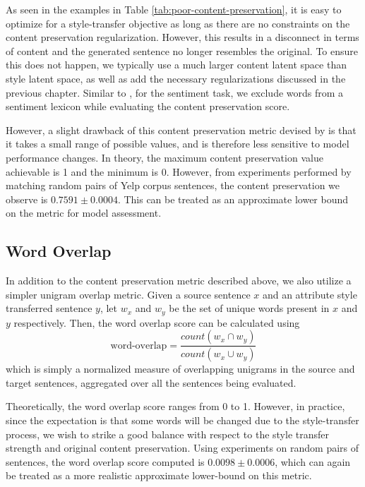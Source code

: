 As seen in the examples in Table \ref{tab:poor-content-preservation}, it is easy to optimize for a style-transfer objective as long as there are no constraints on the content preservation regularization. However, this results in a disconnect in terms of content and the generated sentence no longer resembles the original. To ensure this does not happen, we typically use a much larger content latent space than style latent space, as well as add the necessary regularizations discussed in the previous chapter. Similar to \cite{fu2017style}, for the sentiment task, we exclude words from a sentiment lexicon \citep{hu2004mining} while evaluating the content preservation score.

However, a slight drawback of this content preservation metric devised by \cite{fu2017style} is that it takes a small range of possible values, and is therefore less sensitive to model performance changes. In theory, the maximum content preservation value achievable is 1 and the minimum is 0. However, from experiments performed by matching random pairs of Yelp corpus sentences, the content preservation we observe is $0.7591 \pm 0.0004$. This can be treated as an approximate lower bound on the metric for model assessment.

\subsection{Word Overlap}

In addition to the content preservation metric described above, we also utilize a simpler unigram overlap metric. Given a source sentence $x$ and an attribute style transferred sentence $y$, let $w_x$ and $w_y$ be the set of unique words present in $x$ and $y$ respectively. Then, the word overlap score can be calculated using
\begin{equation*}
	\text{word-overlap} = \frac{count(w_x \cap w_y)}{count(w_x \cup w_y)}
\end{equation*}
which is simply a normalized measure of overlapping unigrams in the source and target sentences, aggregated over all the sentences being evaluated.

Theoretically, the word overlap score ranges from 0 to 1. However, in practice, since the expectation is that some words will be changed due to the style-transfer process, we wish to strike a good balance with respect to the style transfer strength and original content preservation. Using experiments on random pairs of sentences, the word overlap score computed is $0.0098 \pm 0.0006$, which can again be treated as a more realistic approximate lower-bound on this metric.


